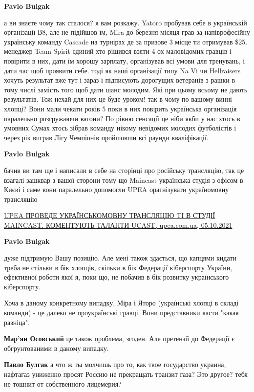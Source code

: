 \begin{itemize}
\begin{itemize}
\begin{itemize} %
\textbf{Pavlo Bulgak} 

а ви знаєте чому так сталося? я вам розкажу. Yatoro пробував себе в українській
організації В8, але не підійшов їм, Mira до березня місяця грав за
напіврофесійну українську команду Cascade на турнірах де за призове 3 місце ти
отримував \$25. менеджер Team Spirit єдиний хто рішився взяти 4-ох маловідомих
гравців і повірити в них, дати їм хорошу зарплату, організував всі умови для
тренувань, і дати час щоб проявити себе. тоді як наші організації типу Na Vi чи
Hellraisers хочуть результат вже тут і зараз і підписують дорогущих ветеранів з
рашки в тому числі замість того щоб дати шанс молодим. Які при цьому всьому не
дають результатів. Тож нехай для них це буде уроком! так в чому по вашому винні
хлопці? Вони мали чекати років 5 поки в них повірить українська організація
паралельно розгружаючи вагони? По рівню сенсації це ніби якби у нас хтось в
умовних Сумах хтось зібрав команду нікому невідомих молодих футболістів і через
рік виграв Лігу Чемпіонів пройшовши всі раунди кваліфікації.

\textbf{Pavlo Bulgak} 

бачив ви там ще і написали в себе на сторінці про російську трансляцію, так це
взагалі зашквар з вашої сторони тому що Maincast українська студія з офісом в
Києві і саме вони паралельно допомогли UPEA орагнізувати україномовну
трансляцію

\href{https://upea.com.ua/news/ukrainomovnij-transljacii-the-international-2021-buti}{%
UPEA ПРОВЕДЕ УКРАЇНСЬКОМОВНУ ТРАНСЛЯЦІЮ TI В СТУДІЇ MAINCAST. КОМЕНТУЮТЬ ТАЛАНТИ UCAST, upea.com.ua, 05.10.2021%
}

\textbf{Pavlo Bulgak} 

дуже підтримую Вашу позицію. Але мені також здається, що капцями кидати треба
не стільки в бік хлопців, скільки в бік Федерації кіберспорту України,
ефективної роботи якої я, поки що, не побачив в бік розвитку українського
кіберспорту.

Хоча в даному конкретному випадку, Міра і Яторо (українські хлопці в складі
команди) - це далеко не проукраїнські гравці. Вони представники касти "какая
разніца".


\textbf{Мар'ян Осовський} це також проблема, згоден. Але претензії до Федерації є обгрунтованими в даному випадку.

\textbf{Павло Булгак} а что ж ты молчишь про то, как твое государство украина, нафтагаз униженно просят Россию не прекращать транзит газа? Это другое? тебя не тошнит от собственного лицемерия?


\end{itemize}
\end{itemize}
\end{itemize}
